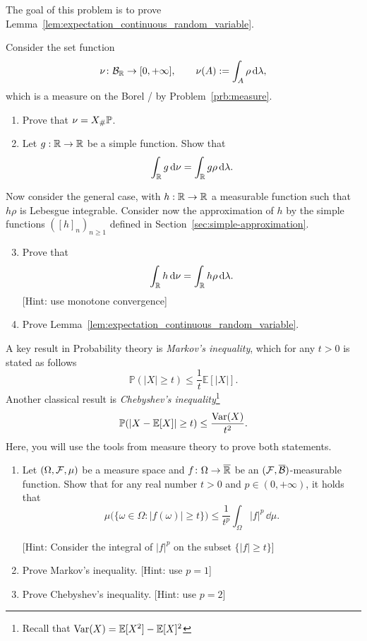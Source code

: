 \begin{problem}\label{prb:expectation_continuous_random_variable}
The goal of this problem is to prove Lemma~\ref{lem:expectation_continuous_random_variable}. 

Consider the set function
\[
	\nu\colon \mathcal B_{\mathbb R} \to [0,+\infty],\qquad\nu(A) := \int_A \rho\, \mathrm{d} \lambda,
\]
which is a measure on the Borel \sigalg/ by Problem~\ref{prb:measure}.
\begin{enumerate}[label=(\alph*)]
\item Prove that $\nu = X_\# \mathbb P$.
\item Let $g : \mathbb R \to \mathbb R$ be a simple function. Show that
\[
	\int_{\mathbb R} g \, \mathrm{d} \nu = \int_{\mathbb R} g \rho \, \mathrm{d} \lambda.
\]
\end{enumerate}

Now consider the general case, with $h : \mathbb R \to \mathbb R$ a measurable function such that $h \rho$ is Lebesgue integrable. Consider now the approximation of $h$ by the simple functions $([h]_n)_{n \ge 1}$ defined in Section~\ref{sec:simple-approximation}.
\begin{enumerate}[label=(\alph*)]
\setcounter{enumi}{2}
\item Prove that 
\[
	\int_{\mathbb R} h \, \mathrm{d} \nu = \int_{\mathbb R} h \rho \, \mathrm{d} \lambda.
\]
[Hint: use monotone convergence]
\item Prove Lemma~\ref{lem:expectation_continuous_random_variable}.
\end{enumerate}
\end{problem}

\begin{problem}\label{prb:markov_chebyshev}
A key result in Probability theory is \emph{Markov's inequality}, which for any $t>0$ is stated as follows
\[
	\mathbb{P}(|X| \geq t) \leq \frac{1}{t} \mathbb{E}[|X|].
\]
Another classical result is \emph{Chebyshev's inequality}\footnote{Recall that $\mathrm{Var}(X) = \mathbb E[X^2] - \mathbb E[X]^2$}
\[
	\mathbb P(|X - \mathbb E[X]| \ge t) \le \frac{\mathrm{Var}(X)}{t^2}.
\]
Here, you will use the tools from measure theory to prove both statements.
\begin{enumerate}[label=(\alph*)]
\item Let $(\Omega,\mathcal F,\mu)$ be a measure space and $f\colon \Omega\to \overline{\mathbb R}$ be an $(\mathcal F,\overline{\mathcal B})$-measurable function. Show that for any real number $t>0$ and $p\in(0,+\infty)$, it holds that
\[
	\mu\bigl(\{\omega\in\Omega : |f(\omega)|\ge t\}\bigr) \le \frac{1}{t^p}\int_\Omega |f|^p\,\dd\mu.
\]

[Hint: Consider the integral of $|f|^p$ on the subset $\{|f|\ge t\}$]
\item Prove Markov's inequality. [Hint: use $p = 1$]
\item Prove Chebyshev's inequality. [Hint: use $p = 2$]
\end{enumerate}
\end{problem}

%
